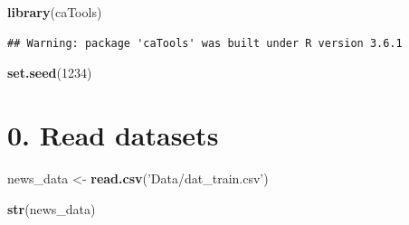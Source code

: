 \documentclass[]{article}
\newenvironment{Shaded}{\begin{snugshade}}{\end{snugshade}}
\newcommand{\DecValTok}[1]{\textcolor[rgb]{0.00,0.00,0.81}{#1}}
\newcommand{\KeywordTok}[1]{\textcolor[rgb]{0.13,0.29,0.53}{\textbf{#1}}}
\newcommand{\NormalTok}[1]{#1}
\newcommand{\StringTok}[1]{\textcolor[rgb]{0.31,0.60,0.02}{#1}}
\begin{document}
\begin{Shaded}
\begin{Highlighting}[]
\KeywordTok{library}\NormalTok{(caTools)}
\end{Highlighting}
\end{Shaded}

\begin{verbatim}
## Warning: package 'caTools' was built under R version 3.6.1
\end{verbatim}

\begin{Shaded}
\begin{Highlighting}[]
\KeywordTok{set.seed}\NormalTok{(}\DecValTok{1234}\NormalTok{)}
\end{Highlighting}
\end{Shaded}

\hypertarget{read-datasets}{%
\section{0. Read datasets}\label{read-datasets}}

\begin{Shaded}
\begin{Highlighting}[]
\NormalTok{news_data <-}\StringTok{ }\KeywordTok{read.csv}\NormalTok{(}\StringTok{'Data/dat_train.csv'}\NormalTok{)}

\KeywordTok{str}\NormalTok{(news_data)}
\end{Highlighting}
\end{Shaded}
\end{document}
